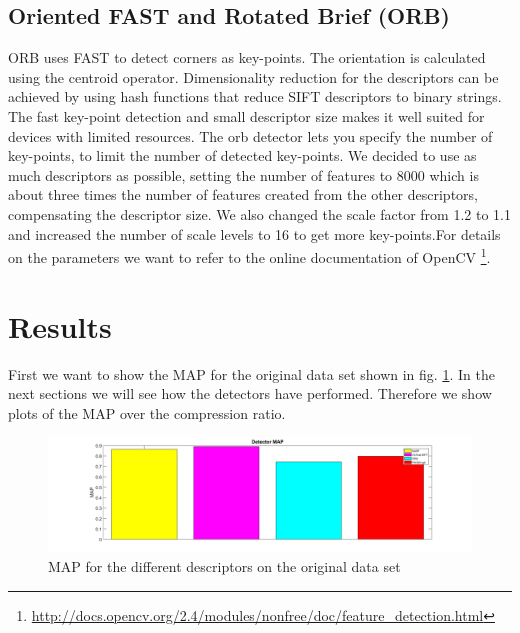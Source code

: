 \documentclass[10pt,a4paper]{article}
\begin{document}
\subsection{Oriented FAST and Rotated Brief (ORB)}
ORB \cite{orb} uses FAST \cite{fast1} \cite{fast2} to detect corners as key-points. The orientation is calculated using the centroid operator. Dimensionality reduction for the descriptors can be achieved by using hash functions that reduce SIFT descriptors to binary strings. The fast key-point detection and small descriptor size makes it well suited for devices with limited resources. The orb detector lets you specify the number of key-points, to limit the number of detected key-points. We decided to use as much descriptors as possible, setting the number of features to 8000 which is about three times the number of features created from the other descriptors, compensating the descriptor size. We also changed the scale factor from 1.2 to 1.1 and increased the number of scale levels to 16 to get more key-points.For details on the parameters we want to refer to the online documentation of OpenCV \footnote{\url{http://docs.opencv.org/2.4/modules/nonfree/doc/feature_detection.html}}.

\section{Results}

First we want to show the MAP for the original data set shown in fig. \ref{fig:map}.
In the next sections we will see how the detectors have performed. Therefore we show plots of the MAP over the compression ratio.

\begin{figure}[!htp]
	\includegraphics[width=1.2\textwidth]{img/refmap.png}
	\caption{MAP for the different descriptors on the original data set}
	\label{fig:map}
\end{figure}
\end{document}
